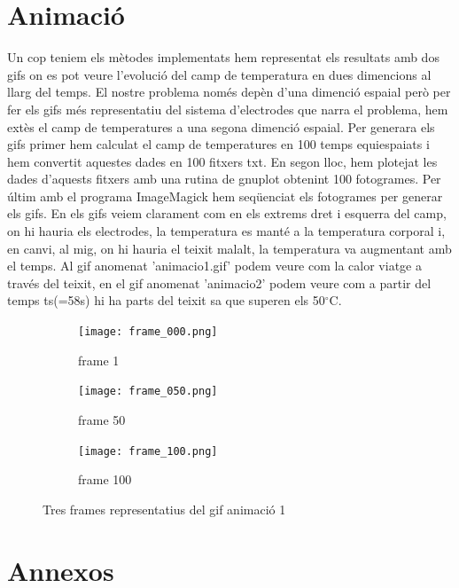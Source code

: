 \documentclass[11pt]{article}
\begin{document}
\section{Animació}
Un cop teniem els mètodes implementats hem representat els resultats amb dos gifs on es pot veure l'evolució del camp de temperatura en dues dimencions al llarg del temps. El nostre problema només depèn d'una dimenció espaial però per fer els gifs més representatiu del sistema d'electrodes que narra el problema, hem extès el camp de temperatures a una segona dimenció espaial. 
Per generara els gifs primer hem calculat el camp de temperatures en 100 temps equiespaiats i hem convertit aquestes dades en 100 fitxers txt. En segon lloc, hem plotejat les dades d'aquests fitxers amb una rutina de gnuplot obtenint 100 fotogrames. Per últim amb el programa ImageMagick hem seqüenciat els fotogrames per generar els gifs.
En els gifs veiem clarament com en els extrems dret i esquerra del camp, on hi hauria els electrodes, la temperatura es manté a la temperatura corporal i, en canvi, al mig, on hi hauria el teixit malalt, la temperatura va augmentant amb el temps. Al gif anomenat 'animacio1.gif' podem veure com la calor viatge a través del teixit, en el gif anomenat 'animacio2' podem veure com a partir del temps ts(=58s) hi ha parts del teixit sa que superen els 50$^\circ$C.

\begin{figure}[hbt!]
    \centering
    \begin{subfigure}{0.3\textwidth}
        \centering
        \texttt{[image: frame\_000.png]}
        \caption{frame 1}
    \end{subfigure}
    \hspace{0.01\textwidth}
    \begin{subfigure}{0.3\textwidth}
        \centering
        \texttt{[image: frame\_050.png]}
        \caption{frame 50}
    \end{subfigure}
    \hspace{0.01\textwidth}
    \begin{subfigure}{0.3\textwidth}
        \centering
        \texttt{[image: frame\_100.png]}
        \caption{frame 100}
    \end{subfigure}

    \caption{Tres frames representatius del gif animació 1}
    \label{fig:dues_imatges}
\end{figure}


\section*{Annexos}
\appendix
\end{document}
